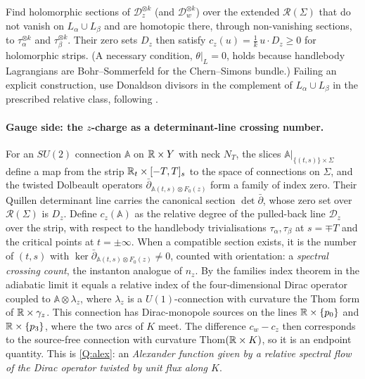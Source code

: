 \begin{problem}\label{prob:avoid}
Find holomorphic sections of $\mathcal D_z^{\otimes k}$ (and $\mathcal D_w^{\otimes k}$) over the extended $\mathcal R(\Sigma)$ that do not vanish on
$L_\alpha\cup L_\beta$ and are homotopic there, through non-vanishing sections, to $\tau_\alpha^{\otimes k}$ and $\tau_\beta^{\otimes k}$.
Their zero sets $D_z$ then satisfy $c_z(u)=\tfrac1k\,u\cdot D_z\ge0$ for holomorphic strips.  (A necessary condition, $\theta|_{L}=0$,
holds because handlebody Lagrangians are Bohr--Sommerfeld for the Chern--Simons bundle.)  Failing an explicit
construction, use Donaldson divisors in the complement of $L_\alpha\cup L_\beta$ in the prescribed relative class, following \cite{AGM,CW}.
\end{problem}

\paragraph{Gauge side: the $z$-charge as a determinant-line crossing number.}
For an $SU(2)$ connection $\mathbb A$ on $\mathbb{R}\times Y$ with neck $N_T$, the slices $\mathbb A|_{\{(t,s)\}\times\Sigma}$ define a map from the strip
$\mathbb{R}_t\times[-T,T]_s$ to the space of connections on $\Sigma$, and the twisted Dolbeault operators
$\bar\partial_{\mathbb A(t,s)\otimes F_0(z)}$ form a family of index zero.  Their Quillen determinant line carries the canonical
section $\det\bar\partial$, whose zero set over $\mathcal R(\Sigma)$ is $D_z$.  Define $c_z(\mathbb A)$ as the relative degree of the pulled-back line $\mathcal D_z$ over the strip, with respect to the handlebody
trivialisations $\tau_\alpha,\tau_\beta$ at $s=\mp T$ and the critical points at $t=\pm\infty$.  When a compatible section exists, it is
the number of $(t,s)$ with $\ker\bar\partial_{\mathbb A(t,s)\otimes F_0(z)}\ne0$, counted with orientation: a \emph{spectral crossing count},
the instanton analogue of $n_z$.
By the families index theorem in the adiabatic limit it equals a relative index of the four-dimensional Dirac operator
coupled to $\mathbb A\otimes\lambda_z$, where $\lambda_z$ is a $U(1)$-connection with curvature the Thom form of $\mathbb{R}\times\gamma_z$.  This
connection has Dirac-monopole sources on the lines $\mathbb{R}\times\{p_0\}$ and $\mathbb{R}\times\{p_3\}$, where the two arcs of $K$ meet.
The difference $c_w-c_z$ then corresponds to the source-free connection with curvature Thom$(\mathbb{R}\times K)$, so it is an
endpoint quantity.  This is \ref{Q:alex}: an \emph{Alexander function given by a relative spectral flow of the Dirac
operator twisted by unit flux along $K$}.

